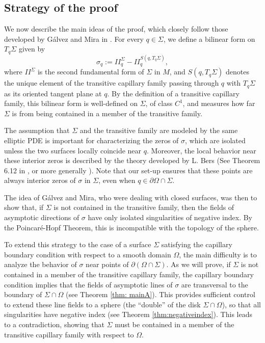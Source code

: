 \documentclass[11pt,reqno]{amsart}
\begin{document}
\subsection{Strategy of the proof} We now describe the main ideas of the proof, which closely follow those developed by Gálvez and Mira in \cite{Galvez-Mira-Uniqueness}. For every $q\in\Sigma$, we define a bilinear form on $T_q\Sigma$ given by
\begin{equation}\label{int.2}
    \sigma_q:=II^{\Sigma}_{q}-II^{S(q,T_q\Sigma)}_q,
\end{equation}
where $II^\Sigma$ is the second fundamental form of $\Sigma$ in $M$, and $S(q,T_q\Sigma)$ denotes the unique element of the transitive capillary family passing through $q$ with $T_q\Sigma$ as its oriented tangent plane at $q$. By the definition of a transitive capillary family, this bilinear form is well-defined on $\Sigma$, of class $C^1$, and measures how far $\Sigma$ is from being contained in a member of the transitive family.

The assumption that $\Sigma$ and the transitive family are modeled by the same elliptic PDE is important for characterizing the zeros of $\sigma$, which are isolated unless the two surfaces locally coincide near $q$. Moreover, the local behavior near these interior zeros is described by the theory developed by L. Bers (See Theorem 6.12 in \cite{ColMin}, or more generally \cite{Bers1956}). Note that our set-up ensures that these points are always interior zeros of $\sigma$ in $\Sigma$, even when $q\in \partial \Omega\cap \Sigma$.

The idea of Gálvez and Mira, who were dealing with closed surfaces, was then to show that, if $\Sigma$  is not contained in the transitive family, then the fields of asymptotic directions of $\sigma$ have only isolated singularities of negative index. By the Poincaré-Hopf Theorem, this is incompatible with the topology of the sphere.

To extend this strategy to the case of a surface $\Sigma$ satisfying the capillary boundary condition with respect to a smooth domain $\Omega$, the main difficulty is to analyze the behavior of $\sigma$ near points of $\partial (\Omega \cap \Sigma)$. As we will prove, if $\Sigma$ is not contained in a member of the transitive capillary family, the capillary boundary condition implies that the fields of asymptotic lines of $\sigma$ are transversal to the boundary of $\Sigma \cap \Omega$ (see Theorem \ref{thm: mainA}). This provides sufficient control to extend these line fields to a sphere (the ``double'' of the disk $\Sigma \cap \Omega$), so that all singularities have negative index (see Theorem \ref{thm:negativeindex}). This leads to a contradiction, showing that $\Sigma$ must be contained in a member of the transitive capillary family with respect to $\Omega$.
\end{document}
